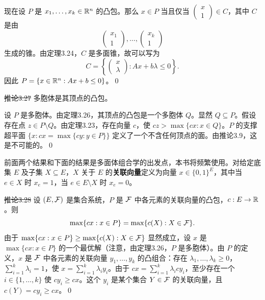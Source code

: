 现在设 $P$ 是 $x_1,\ldots,x_k\in\mathbb R^n$ 的凸包。那么 $x\in P$ 当且仅当 $\begin{pmatrix}x\\1\end{pmatrix}\in C$，其中 $C$ 是由
\[
\begin{pmatrix}x_1\\1\end{pmatrix},\ldots,
\begin{pmatrix}x_k\\1\end{pmatrix}
\]
生成的锥。由定理3.24，$C$ 是多面锥，故可以写为
\[
C=\left\{\begin{pmatrix}x\\\lambda\end{pmatrix}:Ax+b\lambda\le0\right\}.
\]
因此 $P=\{x\in\mathbb R^n:Ax+b\le0\}$。\qed

\st{推论3.27} 多胞体是其顶点的凸包。

\pr 设 $P$ 是多胞体。由定理3.26，其顶点的凸包是一个多胞体 $Q$。显然 $Q\subseteq P$。假设存在点 $z\in P\setminus Q$。由定理3.23，存在向量 $c$，使 $cz>\max\{cx:x\in Q\}$。$P$ 的支撑超平面 $\{x:cx=\max\{cy:y\in P\}\}$ 定义了一个不含任何顶点的面。由推论3.9，这是不可能的。\qed

前面两个结果和下面的结果是多面体组合学的出发点，本书将频繁使用。对给定底集 $E$ 及子集 $X\subseteq E$，$X$ 关于 $E$ 的\textbf{关联向量}定义为向量 $x\in\{0,1\}^E$，其中当 $e\in X$ 时 $x_e=1$，当 $e\in E\setminus X$ 时 $x_e=0$。

\st{推论3.28} 设 $(E,\mathcal F)$ 是集合系统，$P$ 是 $\mathcal F$ 中各元素的关联向量的凸包，$c:E\to\mathbb R$。则
\[
\max\{cx:x\in P\}=\max\{c(X):X\in\mathcal F\}.
\]
\pr 由于 $\max\{cx:x\in P\}\ge\max\{c(X):X\in\mathcal F\}$ 显然成立，设 $x$ 是 $\max\{cx:x\in P\}$ 的一个最优解（注意，由定理3.26，$P$ 是多胞体）。由 $P$ 的定义，$x$ 是 $\mathcal F$ 中各元素的关联向量 $y_1,\ldots,y_k$ 的凸组合：存在 $\lambda_1,\ldots,\lambda_k\ge0$，$\sum_{i=1}^k\lambda_i=1$，使 $x=\sum_{i=1}^k\lambda_i y_i$。由于 $cx=\sum_{i=1}^k\lambda_i cy_i$，至少存在一个 $i\in\{1,\ldots,k\}$ 使 $cy_i\ge cx$。这个 $y_i$ 是某个集合 $Y\in\mathcal F$ 的关联向量，且 $c(Y)=cy_i\ge cx$。\qed

